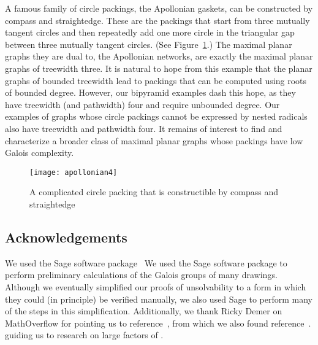 \documentclass[oribibl,10pt]{llncs}
\begin{document}
A famous family of circle packings, the Apollonian gaskets, can be constructed by compass and straightedge. 
These are the packings that start from three mutually tangent circles and then repeatedly add one more circle in the triangular gap between three mutually tangent circles.
(See Figure~\ref{fig:apollonian4}.) 
The maximal planar graphs they are dual to, the Apollonian networks, are exactly the maximal planar graphs of treewidth three. It is natural to hope from this example that the planar graphs of bounded treewidth lead to packings that can be computed using roots of bounded degree. However, our bipyramid examples dash this hope, as they have treewidth (and pathwidth) four and require unbounded degree. Our examples of graphs whose circle packings cannot be expressed by nested radicals also have treewidth and pathwidth four. It remains of interest to find and characterize a broader class of maximal planar graphs whose packings have low Galois complexity.

\begin{figure}[hbt]
\centering\texttt{[image: apollonian4]}
\caption{A complicated circle packing that is constructible by compass and straightedge}
\label{fig:apollonian4}
\end{figure}
\fi

\subsection*{Acknowledgements}

\ifFull
We used the Sage software package~\cite{Sage}
\else
We used the Sage software package
\fi
to perform preliminary calculations of the Galois groups of many drawings. 
\ifFull
Although we eventually simplified our proofs of unsolvability to a form in which they could (in principle) be verified manually, we also used Sage to perform many of the steps in this simplification.
\fi
Additionally, we thank Ricky Demer on MathOverflow for
\ifFull
pointing us to reference~\cite{Har-MC-05}, from which we also found reference~\cite{BakHar-AA-98}.
\else
guiding us to research on large factors of .
\fi


{\raggedright
\ifFull

\else

\fi
}
\end{document}
